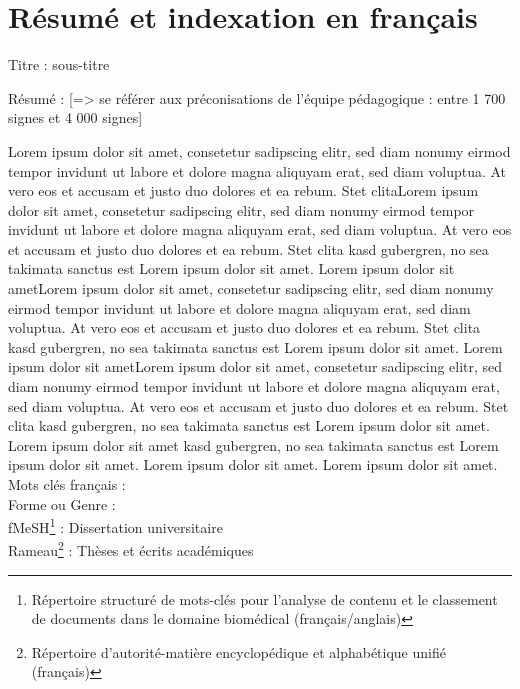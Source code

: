 \chapter*{Résumé et indexation en français}\label{chap:Résumé}

Titre : sous-titre

Résumé : [=> se référer aux préconisations de l’équipe pédagogique : entre 1 700 signes et 4 000 signes]

Lorem ipsum dolor sit amet, consetetur sadipscing elitr, sed diam nonumy eirmod tempor invidunt ut labore et dolore magna aliquyam erat, sed diam voluptua. At vero eos et accusam et justo duo dolores et ea rebum. Stet clitaLorem ipsum dolor sit amet, consetetur sadipscing elitr, sed diam nonumy eirmod tempor invidunt ut labore et dolore magna aliquyam erat, sed diam voluptua. At vero eos et accusam et justo duo dolores et ea rebum. Stet clita kasd gubergren, no sea takimata sanctus est Lorem ipsum dolor sit amet. Lorem ipsum dolor sit ametLorem ipsum dolor sit amet, consetetur sadipscing elitr, sed diam nonumy eirmod tempor invidunt ut labore et dolore magna aliquyam erat, sed diam voluptua. At vero eos et accusam et justo duo dolores et ea rebum. Stet clita kasd gubergren, no sea takimata sanctus est Lorem ipsum dolor sit amet. Lorem ipsum dolor sit ametLorem ipsum dolor sit amet, consetetur sadipscing elitr, sed diam nonumy eirmod tempor invidunt ut labore et dolore magna aliquyam erat, sed diam voluptua. At vero eos et accusam et justo duo dolores et ea rebum. Stet clita kasd gubergren, no sea takimata sanctus est Lorem ipsum dolor sit amet. Lorem ipsum dolor sit amet kasd gubergren, no sea takimata sanctus est Lorem ipsum dolor sit amet. Lorem ipsum dolor sit amet. Lorem ipsum dolor sit amet.
\\

Mots clés français : 
\\

Forme ou Genre : 
\\

fMeSH\footnote{Répertoire structuré de mots-clés pour l'analyse de contenu et le classement de documents dans le domaine biomédical (français/anglais)} : Dissertation universitaire
\\

Rameau\footnote{Répertoire d'autorité-matière encyclopédique et alphabétique unifié (français)} :  Thèses et écrits académiques 	










